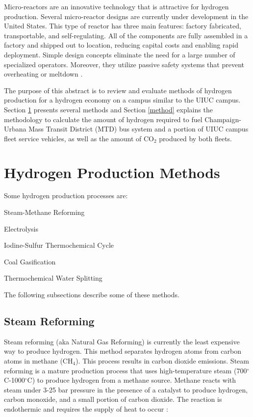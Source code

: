 \documentclass{anstrans}
\begin{document}
Micro-reactors are an innovative technology that is attractive for hydrogen production. Several micro-reactor designs are currently under development in the United States. This type of reactor has three main features: factory fabricated, transportable, and self-regulating. All of the components are fully assembled in a factory and shipped out to location, reducing capital costs and enabling rapid deployment. Simple design concepts eliminate the need for a large number of specialized operators. Moreover, they utilize passive safety systems that prevent overheating or meltdown \cite{noauthor_ultimate_2019}.

The purpose of this abstract is to review and evaluate methods of hydrogen production for a hydrogen economy on a campus similar to the UIUC campus.
Section \ref{section:hydroprod} presents several methods and Section \ref{method} explains the methodology to calculate the amount of hydrogen required to fuel Champaign-Urbana Mass Transit District (MTD) bus system and a portion of UIUC campus fleet service vehicles, as well as the amount of CO$_2$ produced by both fleets.

\section{Hydrogen Production Methods}
\label{section:hydroprod}

Some hydrogen production processes are: 
\begin{description}[font=$\bullet$\scshape\bfseries]
	\item[] Steam-Methane Reforming \cite{noauthor_hydrogen_nodate}
	\item[] Electrolysis \cite{noauthor_hydrogen_nodate}
	\item[] Iodine-Sulfur Thermochemical Cycle \cite{cea_gas-cooled_2006}
	\item[] Coal Gasification \cite{office_of_energy_efficiency_and_renewable_energy_coal_gas_2020}
	\item[] Thermochemical Water Splitting \cite{office_of_energy_efficiency_and_renewable_energy_thermo_water_2020}
\end{description}

The following subsections describe some of these methods.

\subsection{Steam Reforming}

Steam reforming (aka Natural Gas Reforming) is currently the least expensive way to produce hydrogen. This method separates hydrogen atoms from carbon atoms in methane (CH$_4$). This process results in carbon dioxide emissions.
Steam reforming is a mature production process that uses high-temperature steam (700$^{\circ}$C-1000$^{\circ}$C) to produce hydrogen from a methane source. Methane reacts with steam under 3-25 bar pressure in the presence of a catalyst to produce hydrogen, carbon monoxide, and a small portion of carbon dioxide. The reaction is endothermic and requires the supply of heat to occur \cite{noauthor_hydrogen_nodate}:
\end{document}
